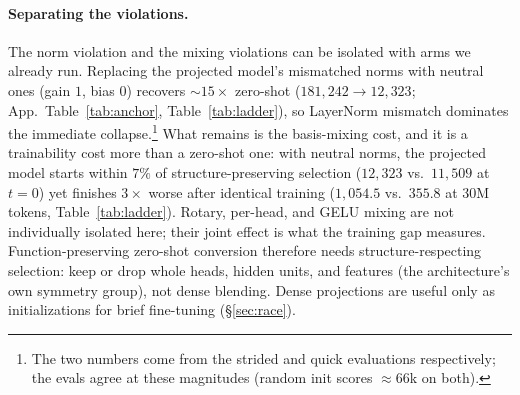 \paragraph{Separating the violations.}
The norm violation and the mixing violations can be isolated with arms we
already run. Replacing the projected model's mismatched norms with neutral ones
(gain $1$, bias $0$) recovers $\sim$$15\times$ zero-shot
($181{,}242 \to 12{,}323$; App.~Table~\ref{tab:anchor}, Table~\ref{tab:ladder}),
so LayerNorm mismatch dominates the immediate collapse.\footnote{The two
numbers come from the strided and quick evaluations respectively; the evals
agree at these magnitudes (random init scores $\approx$66k on both).} What
remains is the basis-mixing cost, and it is a trainability cost more than a
zero-shot one: with neutral norms, the projected model starts within $7\%$ of
structure-preserving selection ($12{,}323$ vs.\ $11{,}509$ at $t{=}0$) yet
finishes $3\times$ worse after identical training ($1{,}054.5$ vs.\ $355.8$ at
30M tokens, Table~\ref{tab:ladder}). Rotary, per-head, and GELU mixing are not
individually isolated here; their joint effect is what the training gap
measures. Function-preserving zero-shot conversion therefore needs
structure-respecting selection: keep or drop whole heads, hidden units, and
features (the architecture's own symmetry group), not dense blending. Dense
projections are useful only as initializations for brief fine-tuning
(\S\ref{sec:race}).

